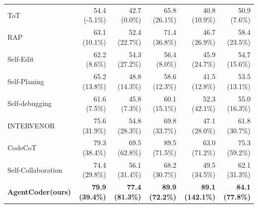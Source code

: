 \documentclass[manuscript,screen,review]{acmart}
\newcommand{\xxx}{AgentCoder\xspace}
\begin{document}
\begin{table}[h!]
\begin{tabular}{l|rrrr|r}
ToT& 54.4 (-5.1\%)&42.7 (0.0\%)&65.8 (26.1\%)&40.8 (10.9\%)&50.9 (7.6\%)\\
RAP& 63.1 (10.1\%)&52.4 (22.7\%)&71.4 (36.8\%)&46.7 (26.9\%)&58.4 (23.5\%)\\
Self-Edit& 62.2 (8.6\%)&54.3 (27.2\%)&56.4 (8.0\%)&45.9 (24.7\%)&54.7 (15.6\%)\\
Self-Planing& 65.2 (13.8\%)&48.8 (14.3\%)&58.6 (12.3\%)&41.5 (12.8\%)&53.5 (13.1\%)\\
Self-debugging& 61.6 (7.5\%)&45.8 (7.3\%)&60.1 (15.1\%)&52.3 (42.1\%)&55.0 (16.3\%)\\
INTERVENOR& 75.6 (31.9\%)&54.8 (28.3\%)&69.8 (33.7\%)&47.1 (28.0\%)&61.8 (30.7\%)\\
CodeCoT& 79.3 (38.4\%)&69.5 (62.8\%)&89.5 (71.5\%)&63.0 (71.2\%)&75.3 (59.2\%)\\
Self-Collaboration& 74.4 (29.8\%)&56.1 (31.4\%)&68.2 (30.7\%)&49.5 (34.5\%)&62.1 (31.3\%)\\
\textbf{\xxx (ours)}&\cellcolor[rgb]{0.9,0.9,0.9}\textbf{ 79.9 (39.4\%)}&\cellcolor[rgb]{0.9,0.9,0.9}\textbf{77.4 (81.3\%)}&\cellcolor[rgb]{0.9,0.9,0.9}\textbf{89.9 (72.2\%)}&\cellcolor[rgb]{0.9,0.9,0.9}\textbf{89.1 (142.1\%)}&\cellcolor[rgb]{0.9,0.9,0.9}\textbf{84.1 (77.8\%)}\\

\end{tabular}
\end{table}
\end{document}
